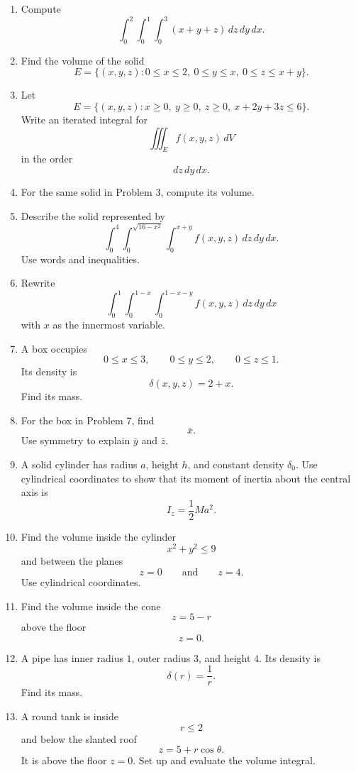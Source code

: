 \begin{enumerate}
\item Compute
\[
    \int_0^2\int_0^1\int_0^3 (x+y+z)\,dz\,dy\,dx.
\]

\item Find the volume of the solid
\[
    E=\{(x,y,z):0\le x\le2,\ 0\le y\le x,\ 0\le z\le x+y\}.
\]

\item Let
\[
    E=\{(x,y,z):x\ge0,\ y\ge0,\ z\ge0,\ x+2y+3z\le6\}.
\]
Write an iterated integral for
\[
    \iiint_E f(x,y,z)\,dV
\]
in the order
\[
    dz\,dy\,dx.
\]

\item For the same solid in Problem 3, compute its volume.

\item Describe the solid represented by
\[
    \int_0^4\int_0^{\sqrt{16-x^2}}\int_0^{x+y}
    f(x,y,z)\,dz\,dy\,dx.
\]
Use words and inequalities.

\item Rewrite
\[
    \int_0^1\int_0^{1-x}\int_0^{1-x-y}
    f(x,y,z)\,dz\,dy\,dx
\]
with \(x\) as the innermost variable.

\item A box occupies
\[
    0\le x\le3,\qquad 0\le y\le2,\qquad 0\le z\le1.
\]
Its density is
\[
    \delta(x,y,z)=2+x.
\]
Find its mass.

\item For the box in Problem 7, find
\[
    \bar x.
\]
Use symmetry to explain \(\bar y\) and \(\bar z\).

\item A solid cylinder has radius \(a\), height \(h\), and constant density \(\delta_0\).
Use cylindrical coordinates to show that its moment of inertia about the central axis is
\[
    I_z=\frac12Ma^2.
\]

\item Find the volume inside the cylinder
\[
    x^2+y^2\le9
\]
and between the planes
\[
    z=0
    \qquad\text{and}\qquad
    z=4.
\]
Use cylindrical coordinates.

\item Find the volume inside the cone
\[
    z=5-r
\]
above the floor
\[
    z=0.
\]

\item A pipe has inner radius \(1\), outer radius \(3\), and height \(4\).  Its density is
\[
    \delta(r)=\frac{1}{r}.
\]
Find its mass.

\item A round tank is inside
\[
    r\le2
\]
and below the slanted roof
\[
    z=5+r\cos\theta.
\]
It is above the floor \(z=0\).  Set up and evaluate the volume integral.


\end{enumerate}
